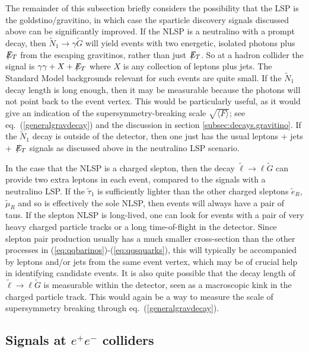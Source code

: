 \documentclass[11pt]{article}
\def\stilde{\widetilde}
\def\G{\stilde G}
\def\NI{\stilde N_1}
\def\Et{{\slashchar{E}_T}}
\def\slashchar#1{\setbox0=\hbox{$#1$}           %
   \dimen0=\wd0                                 %
   \setbox1=\hbox{/} \dimen1=\wd1               %
   \ifdim\dimen0>\dimen1                        %
      \rlap{\hbox to \dimen0{\hfil/\hfil}}      %
      #1                                        %
   \else                                        %
      \rlap{\hbox to \dimen1{\hfil$#1$\hfil}}   %
      /                                         %
   \fi}                                        %
\begin{document}
The remainder of this subsection briefly considers the possibility that 
the LSP is the goldstino/gravitino, in which case the sparticle discovery 
signals discussed above can be significantly improved. If the NLSP is a 
neutralino with a prompt decay, then $\NI\rightarrow \gamma\G$ will yield 
events with two energetic, isolated photons plus $\Et$ from the escaping 
gravitinos, rather than just $\Et$. So at a hadron collider the signal is 
$\gamma\gamma+X+\Et$ where $X$ is any collection of leptons plus jets. The 
Standard Model backgrounds relevant for such events are quite small. If 
the $\NI$ decay length is long enough, then it may be measurable because 
the photons will not point back to the event vertex. This would be 
particularly useful, as it would give an indication of the 
supersymmetry-breaking scale $\sqrt{\langle F \rangle}$; see 
eq.~(\ref{generalgravdecay}) and the discussion in section 
\ref{subsec:decays.gravitino}. If the $\NI$ decay is outside of the 
detector, then one just has the usual leptons + jets + $\Et$ signals as 
discussed above in the neutralino LSP scenario.

In the case that the NLSP is a charged slepton, then the decay $\stilde 
\ell \rightarrow \ell\G$ can provide two extra leptons in each event, 
compared to the signals with a neutralino LSP. If the $\stilde \tau_1$ is 
sufficiently lighter than the other charged sleptons $\stilde e_R$, 
$\stilde \mu_R$ and so is effectively the sole NLSP, then events will 
always have a pair of taus. If the slepton NLSP is long-lived, one can 
look for events with a pair of very heavy charged particle tracks or a 
long time-of-flight in the detector. Since slepton pair production usually 
has a much smaller cross-section than the other processes in 
(\ref{eq:qqbarinos})-(\ref{eq:qqsquarks}), this will typically be 
accompanied by leptons and/or jets from the same event vertex, which may 
be of crucial help in identifying candidate events. It is also quite 
possible that the decay length of $\stilde \ell \rightarrow \ell\G$ is 
measurable within the detector, seen as a macroscopic kink in the charged 
particle track. This would again be a way to measure the scale
of supersymmetry breaking through eq.~(\ref{generalgravdecay}).

\subsection{Signals at $e^+e^-$ colliders}\label{subsec:signals.LEPNLC}
\setcounter{equation}{0}
\setcounter{footnote}{1}
\end{document}

